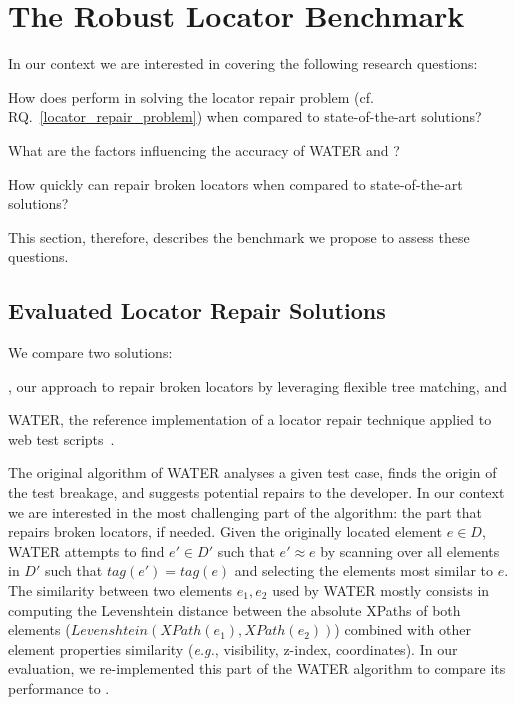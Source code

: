 \section{The Robust Locator Benchmark}\label{erratum:sec:benchmark}
In our context we are interested in covering the following research questions:
\begin{rqn}\label{rq:performance}
    How does \erratum{} perform in solving the locator repair problem (cf. RQ.~\ref{locator_repair_problem}) when compared to state-of-the-art solutions?
\end{rqn}
\begin{rqn}\label{rq:influenceFactors}
    What are the factors influencing the accuracy of WATER and \erratum?
\end{rqn}
\begin{rqn}\label{rq:computationTime}
    How quickly can \erratum{} repair broken locators when compared to state-of-the-art solutions?
\end{rqn}
This section, therefore, describes the benchmark we propose to assess these questions.

\subsection{Evaluated Locator Repair Solutions}\label{erratum:sec:consideredSolutions}
We compare two solutions: 
\begin{inparaenum}
    \item \erratum{}, our approach to repair broken locators by leveraging flexible tree matching, and
    \item WATER, the reference implementation of a locator repair technique applied to web test scripts~\cite{choudhary2011water}.
\end{inparaenum}

The original algorithm of WATER analyses a given test case, finds the origin of the test breakage, and suggests potential repairs to the developer.
In our context we are interested in the most challenging part of the algorithm: the part that repairs broken locators, if needed.
Given the originally located element $e \in D$, WATER attempts to find $e' \in D'$ such that $e' \approx e$ by scanning over all elements in $D'$ such that $tag(e') = tag(e)$ and selecting the elements most similar to $e$. 
The similarity between two elements $e_1, e_2$ used by WATER mostly consists in computing the Levenshtein distance between the absolute XPaths of both elements ($Levenshtein(XPath(e_1), XPath(e_2))$) combined with other element properties similarity (\emph{e.g.}, visibility, z-index, coordinates).
In our evaluation, we re-implemented this part of the WATER algorithm to compare its performance to \erratum{}.

